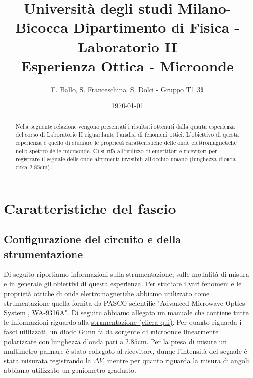 \documentclass[letterpaper,12pt]{article}
\begin{document}
\title{{\small Università degli studi Milano-Bicocca  Dipartimento di Fisica - Laboratorio II }\\
	Esperienza Ottica - Microonde}
\author{F. Ballo, S. Franceschina, S. Dolci - Gruppo T1 39}
\date{\today}
\maketitle
\thispagestyle{logoheader}


\begin{abstract}
	Nella seguente relazione vengono presentati i risultati ottenuti dalla quarta esperienza del corso di Laboratorio II riguardante l'analisi di fenomeni ottici. L'obiettivo di questa esperienza è quello di studiare le proprietà caratteristiche delle onde elettromagnetiche nello spettro delle microonde. Ci si rifà all'utilizzo di emettitori e ricevitori per registrare il segnale delle onde altrimenti invisibili all'occhio umano (lunghezza d'onda circa 2.85cm).
	\begin{adjustwidth}{-1cm}{-1cm}
	\end{adjustwidth}
\end{abstract}
\tableofcontents
\newpage

\section{Caratteristiche del fascio}

\subsection{Configurazione del circuito e della strumentazione}
Di seguito riportiamo informazioni sulla strumentazione, sulle modalità di misura e in generale gli obiettivi di questa esperienza.
Per studiare i vari fenomeni e le proprietà ottiche di onde elettromagnetiche abbiamo utilizzato come strumentazione 
quella fornita da PASCO scientific "Advanced Microwave Optics System , WA-9316A".
Di seguito abbiamo allegato un manuale che contiene tutte le informazioni riguardo alla
\href{https://cdn.pasco.com/product_document/Microwave-Optics-Experiment-Guide-WA-9314C.pdf}{strumentazione (clicca qui)}.
Per quanto riguarda i fasci utilizzati, un diodo Gunn fa da sorgente di microonde linearmente polarizzate con lunghezza d'onda pari a $2.85$cm. Per la presa di misure un multimetro palmare è stato collegato al ricevitore, dunqe l'intensità del segnale è stata misurata registrando la $\Delta V$, mentre per quanto riguarda la misura di angoli abbiamo utilizzato un goniometro graduato.
\
\end{document}
